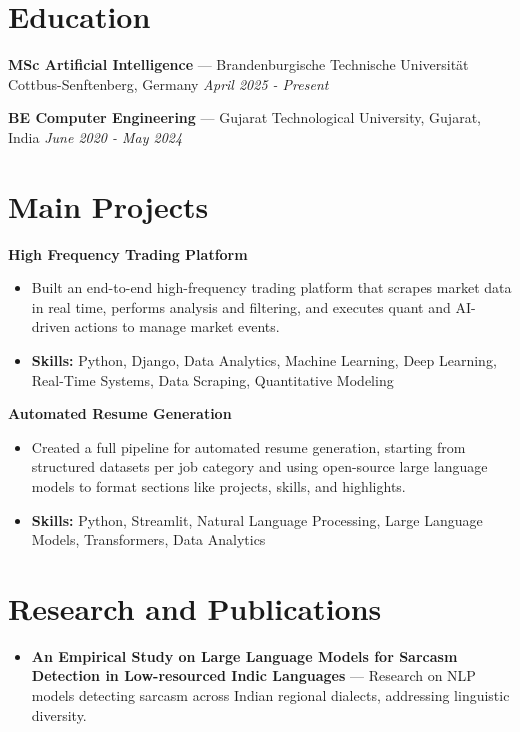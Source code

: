 \documentclass[a4paper,10pt]{article}
\begin{document}
\section*{Education}
\textbf{MSc Artificial Intelligence} — Brandenburgische Technische Universität Cottbus-Senftenberg, Germany \hfill \textit{April 2025 - Present}\par
\vspace{1.5pt}
\textbf{BE Computer Engineering} — Gujarat Technological University, Gujarat, India \hfill \textit{June 2020 - May 2024}\par

\section*{Main Projects}
\textbf{High Frequency Trading Platform}\par
\vspace{1pt}
\begin{itemize}
  \item Built an end-to-end high-frequency trading platform that scrapes market data in real time, performs analysis and filtering, and executes quant and AI-driven actions to manage market events.
  \item \textbf{Skills:} Python, Django, Data Analytics, Machine Learning, Deep Learning, Real-Time Systems, Data Scraping, Quantitative Modeling
\end{itemize}
\vspace{3pt}
\textbf{Automated Resume Generation}\par
\vspace{1pt}
\begin{itemize}
  \item Created a full pipeline for automated resume generation, starting from structured datasets per job category and using open-source large language models to format sections like projects, skills, and highlights.
  \item \textbf{Skills:} Python, Streamlit, Natural Language Processing, Large Language Models, Transformers, Data Analytics
\end{itemize}

\section*{Research and Publications}
\begin{itemize}
\item \textbf{An Empirical Study on Large Language Models for Sarcasm Detection in Low-resourced Indic Languages} — Research on NLP models detecting sarcasm across Indian regional dialects, addressing linguistic diversity.
\end{itemize}
\end{document}
